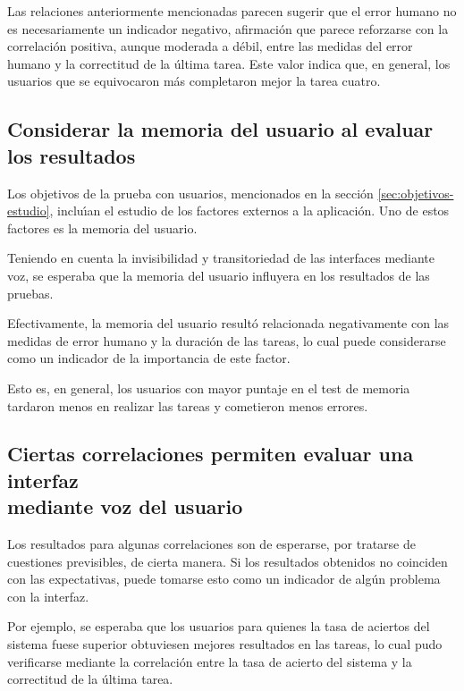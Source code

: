 Las relaciones anteriormente mencionadas parecen sugerir que el error humano no es necesariamente
un indicador negativo, afirmaci\'on que parece reforzarse con la correlaci\'on positiva, aunque moderada
a d\'ebil, entre las medidas del error humano y la correctitud de la \'ultima tarea. Este valor
indica que, en general, los usuarios que se equivocaron m\'as completaron mejor la tarea cuatro.

\subsection[Considerar la memoria del usuario al evaluar los resultados]
{Considerar la memoria del usuario al evaluar los resultados}
Los objetivos de la prueba con usuarios, mencionados en la secci\'on \ref{sec:objetivos-estudio},
inclu{\'\i}an el estudio de los factores externos a la aplicaci\'on. Uno de estos factores
es la memoria del usuario.

Teniendo en cuenta la invisibilidad y transitoriedad de las interfaces mediante
voz, se esperaba que la memoria del usuario influyera en los resultados de
las pruebas.

Efectivamente, la memoria del usuario result\'o relacionada negativamente con las medidas 
de error humano y la duraci\'on de las tareas, lo cual puede considerarse como un indicador de 
la importancia de este factor.

Esto es, en general, los usuarios con mayor puntaje en el test de memoria
tardaron menos en realizar las tareas y cometieron menos errores.

\subsection[Ciertas correlaciones permiten evaluar una interfaz mediante voz del usuario]
{Ciertas correlaciones permiten evaluar una interfaz \\ mediante voz del usuario}

Los resultados para algunas correlaciones son de esperarse, por tratarse de cuestiones
previsibles, de cierta manera. Si los resultados obtenidos no coinciden con las expectativas,
puede tomarse esto como un indicador de alg\'un problema con la interfaz. 

Por ejemplo, se esperaba que los usuarios para quienes la tasa de aciertos del sistema fuese superior
obtuviesen mejores resultados en las tareas, lo cual pudo verificarse mediante la correlaci\'on 
entre la tasa de acierto del sistema y la correctitud de la \'ultima tarea.

